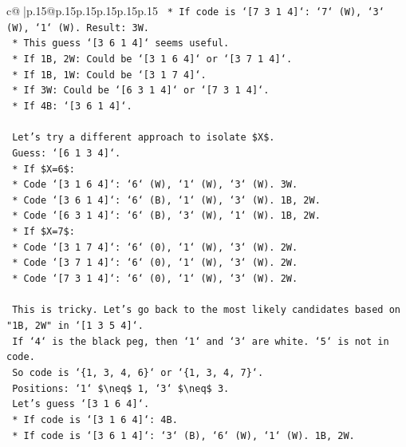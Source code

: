 \documentclass{article}
\begin{document}
{\begin{supertabular}{c@{$\;$}|p{.15\linewidth}@{}p{.15\linewidth}p{.15\linewidth}p{.15\linewidth}p{.15\linewidth}p{.15\linewidth}}
{{{\texttt{        *   If code is `{[}7 3 1 4{]}`: `7` (W), `3` (W), `1` (W). Result: 3W.} \\
\texttt{    *   This guess `{[}3 6 1 4{]}` seems useful.} \\
\texttt{        *   If 1B, 2W: Could be `{[}3 1 6 4{]}` or `{[}3 7 1 4{]}`.} \\
\texttt{        *   If 1B, 1W: Could be `{[}3 1 7 4{]}`.} \\
\texttt{        *   If 3W: Could be `{[}6 3 1 4{]}` or `{[}7 3 1 4{]}`.} \\
\texttt{        *   If 4B: `{[}3 6 1 4{]}`.} \\
\\ 
\texttt{    Let's try a different approach to isolate \$X\$.} \\
\texttt{    Guess: `{[}6 1 3 4{]}`.} \\
\texttt{    *   If \$X=6\$:} \\
\texttt{        *   Code `{[}3 1 6 4{]}`: `6` (W), `1` (W), `3` (W). 3W.} \\
\texttt{        *   Code `{[}3 6 1 4{]}`: `6` (B), `1` (W), `3` (W). 1B, 2W.} \\
\texttt{        *   Code `{[}6 3 1 4{]}`: `6` (B), `3` (W), `1` (W). 1B, 2W.} \\
\texttt{    *   If \$X=7\$:} \\
\texttt{        *   Code `{[}3 1 7 4{]}`: `6` (0), `1` (W), `3` (W). 2W.} \\
\texttt{        *   Code `{[}3 7 1 4{]}`: `6` (0), `1` (W), `3` (W). 2W.} \\
\texttt{        *   Code `{[}7 3 1 4{]}`: `6` (0), `1` (W), `3` (W). 2W.} \\
\\ 
\texttt{    This is tricky. Let's go back to the most likely candidates based on "1B, 2W" in `{[}1 3 5 4{]}`.} \\
\texttt{    If `4` is the black peg, then `1` and `3` are white. `5` is not in code.} \\
\texttt{    So code is `\{1, 3, 4, 6\}` or `\{1, 3, 4, 7\}`.} \\
\texttt{    Positions: `1` \$\textbackslash{}neq\$ 1, `3` \$\textbackslash{}neq\$ 3.} \\
\texttt{    Let's guess `{[}3 1 6 4{]}`.} \\
\texttt{    *   If code is `{[}3 1 6 4{]}`: 4B.} \\
\texttt{    *   If code is `{[}3 6 1 4{]}`: `3` (B), `6` (W), `1` (W). 1B, 2W.} \\
}}}
\end{supertabular}}
\end{document}
